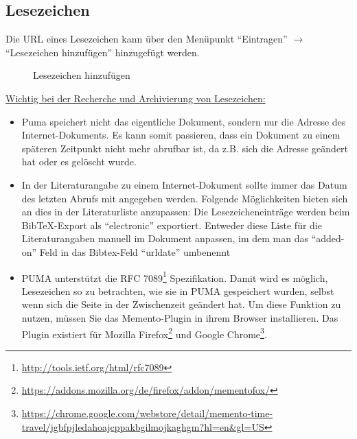 \subsection{Lesezeichen} %
\label{subsec:lesezeichen}
Die URL eines Lesezeichen  kann über den Menüpunkt \enquote{Eintragen} $\to$ \enquote{Lesezeichen hinzufügen} hinzugefügt werden. 
\begin{figure}[h!]
 \centering
 \caption{Lesezeichen hinzufügen}
 \label{fig:lesezeichenHinzufuegen}
\end{figure}  
\underline{Wichtig bei der Recherche und Archivierung von Lesezeichen:}
\begin{itemize}
    \item Puma speichert nicht das eigentliche Dokument, sondern nur die Adresse des Internet-Dokuments. Es kann somit passieren, dass ein Dokument zu einem späteren Zeitpunkt nicht mehr abrufbar ist, da z.B. sich die Adresse geändert hat oder es gelöscht wurde.  
    \item In der Literaturangabe zu einem Internet-Dokument sollte immer das Datum des letzten Abrufs mit angegeben werden. Folgende Möglichkeiten bieten sich an dies in der Literaturliste anzupassen: Die Lesezeicheneinträge werden beim BibTeX-Export als \enquote{electronic} exportiert. Entweder diese Liste für die Literaturangaben manuell im Dokument anpassen, im dem man das \enquote{added-on} Feld in das Bibtex-Feld \enquote{urldate} umbenennt\autocite[Vgl. das Benutzerhandbuch zum BibLaTeX Paket][S.10 (der Eingabetyp \enquote{online} wird synonym zu \enquote{electronic} verwendet. Damit der Zitationsstil das Abrufdatum hinzufügt muss das Feld urldate ausgefüllt sein.)]{lehmann2016biblatex}
    \item PUMA unterstützt die RFC 7089\footnote{\url{http://tools.ietf.org/html/rfc7089}} Spezifikation. Damit wird es möglich, Lesezeichen so zu betrachten, wie sie in PUMA gespeichert wurden, selbst wenn sich die Seite in der Zwischenzeit geändert hat. Um diese Funktion zu nutzen, müssen Sie das Memento-Plugin in ihrem Browser installieren. Das Plugin existiert für Mozilla Firefox\footnote{\url{https://addons.mozilla.org/de/firefox/addon/mementofox/}} und Google Chrome\footnote{\url{https://chrome.google.com/webstore/detail/memento-time-travel/jgbfpjledahoajcppakbgilmojkaghgm?hl=en&gl=US}}. 
\end{itemize}
